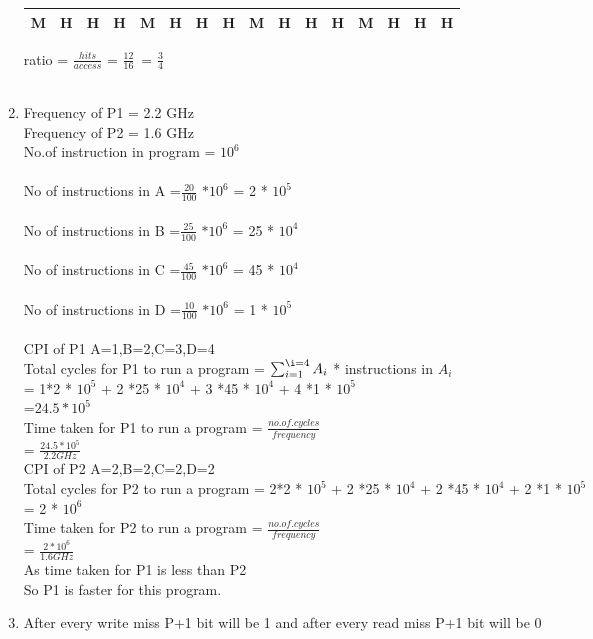 \documentclass[12pt]{article}
\begin{document}
\begin{enumerate}
\begin{center}
\begin{tabular}{ |c|c|c|c|c|c|c|c|c|c|c|c|c|c|c|c| }
			M&H&H&H&M&H&H&H&M&H&H&H&M&H&H&H \\  
			\hline
		\end{tabular}
	\end{center}
	ratio  =
	\(\frac{hits}{access}\) =
	\(\frac{12}{16}\)\      =
	\(\frac{3}{4}\)\    \\\\
	\item Frequency of P1 = 2.2 GHz\\
	Frequency of P2 = 1.6 GHz \\
	No.of instruction in program = $10^{6}$\\\\
	No of instructions in A
	=\(\frac{20}{100}\) $*10^{6}$  = 2 * $10^{5}$\\\\
	No of instructions in B
	=\(\frac{25}{100}\) $*10^{6}$  = 25 * $10^{4}$\\\\
	No of instructions in C
	=\(\frac{45}{100}\) $*10^{6}$  = 45 * $10^{4}$\\\\
	No of instructions in D
	=\(\frac{10}{100}\) $*10^{6}$  = 1 * $10^{5}$\\\\
	CPI of P1 A=1,B=2,C=3,D=4 \\
	Total cycles for P1 to run a program = $\sum_{i=1}^{\i=4}
	A_{i}$ * instructions in $A_{i}$\\
	= 1*2 * $10^{5}$ + 2 *25 * $10^{4}$ + 3 *45 * $10^{4}$ + 4 *1 * $10^{5}$\\ 
	=$24.5 * 10^{5}$\\
	Time taken for P1 to run a program = 
	\(\frac{no. of .cycles}{frequency}\)\\=
	\(\frac{24.5 * 10^{5}}{2.2GHz}\)\\
	CPI of P2 A=2,B=2,C=2,D=2 \\
	Total cycles for P2 to run a program 
	= 2*2 * $10^{5}$ + 2 *25 * $10^{4}$ + 2 *45 * $10^{4}$ + 2 *1 * $10^{5}$\\
	= 2 * $ 10^{6}$\\
	Time taken for P2 to run a program = 
	\(\frac{no. of .cycles}{frequency}\)\\=
	\(\frac{2 * 10^{6}}{1.6GHz}\)\\
	As time taken for P1 is less than P2 \\
	So P1 is faster for this program.\\
	\item After every write miss P+1 bit will be 1 and after every read miss P+1 bit will be 0\\
	

\end{enumerate}
\end{document}
